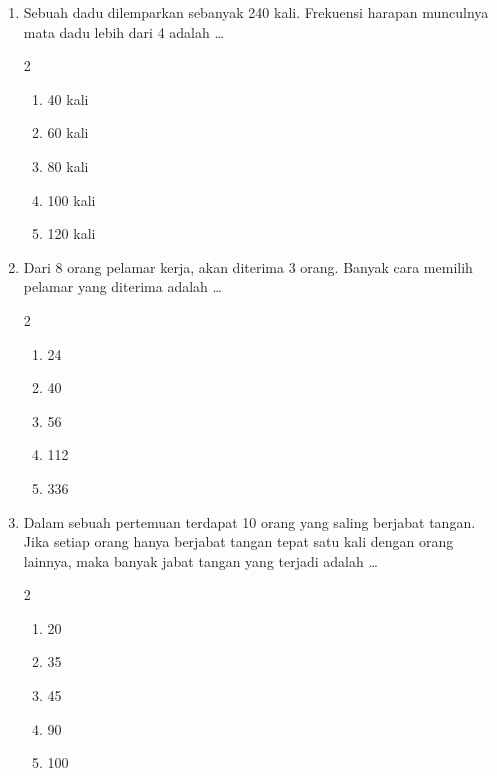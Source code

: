 \documentclass[12pt,a4paper]{article}
\begin{document}
\begin{enumerate}[itemsep=2ex]
    \item Sebuah dadu dilemparkan sebanyak 240 kali. Frekuensi harapan munculnya mata dadu lebih dari 4 adalah \dots
    \begin{multicols}{2}
    \begin{enumerate}[label=\Alph*.]
        \item 40 kali
        \item 60 kali
        \item 80 kali
        \item 100 kali
        \item 120 kali
    \end{enumerate}
    \end{multicols}

    \item Dari 8 orang pelamar kerja, akan diterima 3 orang. Banyak cara memilih pelamar yang diterima adalah \dots
    \begin{multicols}{2}
    \begin{enumerate}[label=\Alph*.]
        \item 24
        \item 40
        \item 56
        \item 112
        \item 336
    \end{enumerate}
    \end{multicols}

    \item Dalam sebuah pertemuan terdapat 10 orang yang saling berjabat tangan. Jika setiap orang hanya berjabat tangan tepat satu kali dengan orang lainnya, maka banyak jabat tangan yang terjadi adalah \dots
    \begin{multicols}{2}
    \begin{enumerate}[label=\Alph*.]
        \item 20
        \item 35
        \item 45
        \item 90
        \item 100
    \end{enumerate}
    \end{multicols}

\end{enumerate}
\end{document}
